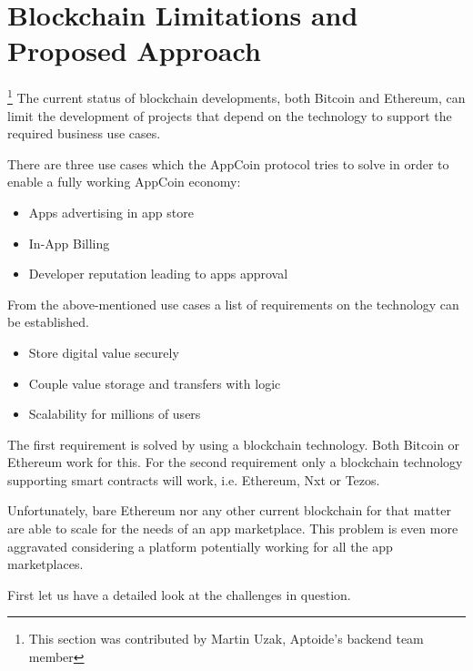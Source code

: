 \section{Blockchain Limitations and Proposed Approach}
\label{sec:limitations}

\footnote{This section was contributed by Martin Uzak, Aptoide's backend team member}
The current status of blockchain developments, both Bitcoin and Ethereum, can limit the development of projects that depend on the technology to support the required business use cases. %

 
There are three use cases which the AppCoin protocol tries to solve in order to enable a fully working AppCoin economy:


\begin{itemize}
    \item Apps advertising in app store
    \item In-App Billing 
    \item Developer reputation leading to apps approval
\end{itemize}

From the above-mentioned use cases a list of requirements on the technology can be established. 

\begin{itemize}
    \item Store digital value securely
    \item Couple value storage and transfers with logic
    \item Scalability for millions of users
\end{itemize}

The first requirement is solved by using a blockchain technology. Both Bitcoin or Ethereum work for this. For the second requirement only a blockchain technology supporting smart contracts will work, i.e. Ethereum, Nxt or Tezos.

Unfortunately, bare Ethereum nor any other current blockchain for that matter are able to scale for the needs of an app marketplace. This problem is even more aggravated considering a platform potentially working for all the app marketplaces.

First let us have a detailed look at the challenges in question.

